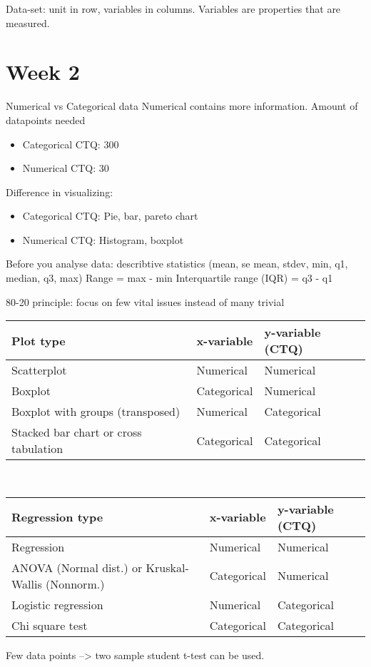 \documentclass{notes}
\begin{document}
Data-set: unit in row, variables in columns. Variables are properties that are measured.

\section{Week 2}
Numerical vs Categorical data
Numerical contains more information.
Amount of datapoints needed
\begin{itemize}
    \item Categorical CTQ: 300
    \item Numerical CTQ: 30
\end{itemize}
Difference in visualizing:
\begin{itemize}
    \item Categorical CTQ: Pie, bar, pareto chart
    \item Numerical CTQ: Histogram, boxplot
\end{itemize}

Before you analyse data: describtive statistics (mean, se mean, stdev, min, q1, median, q3, max)
Range = max - min
Interquartile range (IQR) = q3 - q1

80-20 principle: focus on few vital issues instead of many trivial

\begin{tabular}{l|l l}
Plot type & x-variable & y-variable (CTQ) \\ \hline
Scatterplot & Numerical & Numerical \\
Boxplot & Categorical & Numerical \\
Boxplot with groups (transposed) & Numerical & Categorical \\
Stacked bar chart or cross tabulation & Categorical & Categorical \\
\end{tabular}
\\
\begin{tabular}{l|l l}
Regression type & x-variable & y-variable (CTQ) \\ \hline
Regression & Numerical & Numerical \\
ANOVA (Normal dist.) or Kruskal-Wallis (Nonnorm.) & Categorical & Numerical \\
Logistic regression & Numerical & Categorical \\
Chi square test & Categorical & Categorical \\
\end{tabular}
Few data points --> two sample student t-test can be used.
\end{document}

